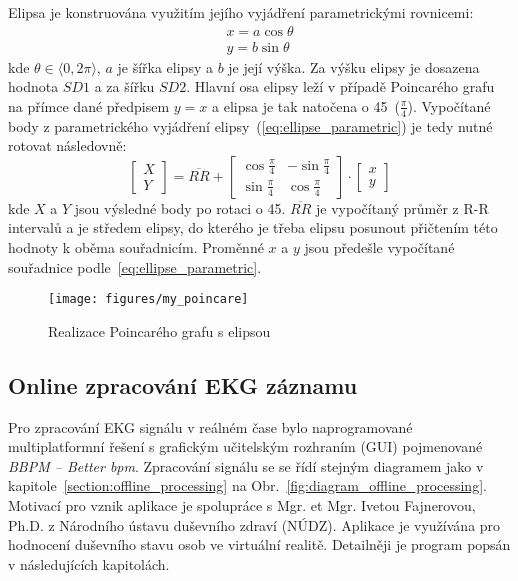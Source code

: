 \noindent Elipsa je konstruována využitím jejího vyjádření parametrickými
rovnicemi:
\begin{gather}
    \label{eq:ellipse_parametric}
    x = a \cos \theta \nonumber \\
    y = b \sin \theta
\end{gather}
kde $\theta \in \langle 0, 2\pi \rangle$, $a$ je šířka elipsy a $b$ je její
výška. Za výšku elipsy je dosazena hodnota $SD1$ a za šířku $SD2$. Hlavní osa
elipsy leží v případě Poincarého grafu na přímce dané předpisem $y=x$ a elipsa
je tak natočena o 45\degree~($\frac{\pi}{4}$). Vypočítané body z parametrického
vyjádření elipsy~(\ref{eq:ellipse_parametric}) je tedy nutné
rotovat následovně:
\begin{equation}
    \begin{bmatrix}
        X \\
        Y
    \end{bmatrix}
    =
    \overline{RR} +
    \begin{bmatrix}
        \cos \frac{\pi}{4} & -\sin \frac{\pi}{4} \\
        \sin \frac{\pi}{4} & \cos \frac{\pi}{4}
    \end{bmatrix}
    \cdot
    \begin{bmatrix}
        x \\
        y
    \end{bmatrix}
\end{equation}
kde $X$ a $Y$ jsou výsledné body po rotaci o 45\degree. $\overline{RR}$ je
vypočítaný průměr z R-R intervalů a je středem elipsy, do kterého je třeba
elipsu posunout přičtením této hodnoty k oběma souřadnicím. Proměnné $x$ a $y$
jsou předešle vypočítané souřadnice podle~\ref{eq:ellipse_parametric}.

\bigskip

\begin{figure}[h]
    \begin{center}
        \texttt{[image: figures/my\_poincare]}
        \caption{Realizace Poincarého grafu s elipsou}
        \label{fig:my_poincare}
    \end{center}
\end{figure}

\subsection{Online zpracování EKG záznamu}
\label{section:online_processing}
Pro zpracování EKG signálu v reálném čase bylo naprogramované multiplatformní
řešení s grafickým učitelským rozhraním (GUI) pojmenované \textit{BBPM -- Better
    bpm}. Zpracování signálu se se řídí stejným diagramem jako v
kapitole~\ref{section:offline_processing} na
Obr.~\ref{fig:diagram_offline_processing}. Motivací pro vznik aplikace je
spolupráce s Mgr. et Mgr. Ivetou Fajnerovou, Ph.D. z Národního ústavu duševního
zdraví (NÚDZ). Aplikace je využívána pro hodnocení duševního stavu osob ve
virtuální realitě. Detailněji je program popsán v následujících kapitolách.

